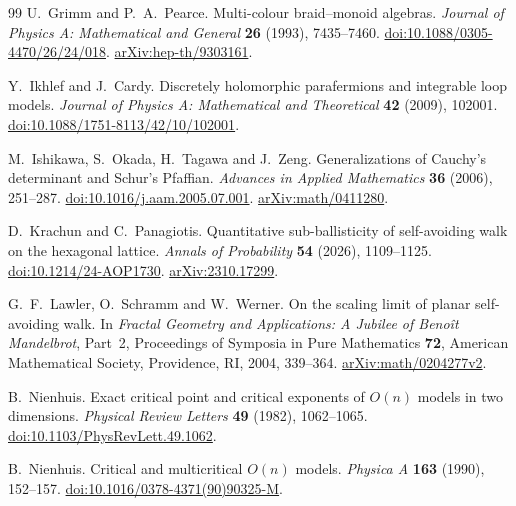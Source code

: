 \begin{thebibliography}{99}
U.~Grimm and P.~A.~Pearce.
Multi-colour braid--monoid algebras.
\emph{Journal of Physics A: Mathematical and General} \textbf{26} (1993), 7435--7460.
\href{https://doi.org/10.1088/0305-4470/26/24/018}{doi:10.1088/0305-4470/26/24/018}.
\href{https://arxiv.org/abs/hep-th/9303161}{arXiv:hep-th/9303161}.

Y.~Ikhlef and J.~Cardy.
Discretely holomorphic parafermions and integrable loop models.
\emph{Journal of Physics A: Mathematical and Theoretical} \textbf{42} (2009), 102001.
\href{https://doi.org/10.1088/1751-8113/42/10/102001}{doi:10.1088/1751-8113/42/10/102001}.

M.~Ishikawa, S.~Okada, H.~Tagawa and J.~Zeng.
Generalizations of Cauchy's determinant and Schur's Pfaffian.
\emph{Advances in Applied Mathematics} \textbf{36} (2006), 251--287.
\href{https://doi.org/10.1016/j.aam.2005.07.001}{doi:10.1016/j.aam.2005.07.001}.
\href{https://arxiv.org/abs/math/0411280}{arXiv:math/0411280}.

D.~Krachun and C.~Panagiotis.
Quantitative sub-ballisticity of self-avoiding walk on the hexagonal lattice.
\emph{Annals of Probability} \textbf{54} (2026), 1109--1125.
\href{https://doi.org/10.1214/24-AOP1730}{doi:10.1214/24-AOP1730}.
\href{https://arxiv.org/abs/2310.17299}{arXiv:2310.17299}.

G.~F.~Lawler, O.~Schramm and W.~Werner.
On the scaling limit of planar self-avoiding walk.
In \emph{Fractal Geometry and Applications: A Jubilee of Beno\^it Mandelbrot},
Part~2, Proceedings of Symposia in Pure Mathematics \textbf{72},
American Mathematical Society, Providence, RI, 2004, 339--364.
\href{https://arxiv.org/abs/math/0204277v2}{arXiv:math/0204277v2}.

B.~Nienhuis.
Exact critical point and critical exponents of $O(n)$ models in two dimensions.
\emph{Physical Review Letters} \textbf{49} (1982), 1062--1065.
\href{https://doi.org/10.1103/PhysRevLett.49.1062}{doi:10.1103/PhysRevLett.49.1062}.

B.~Nienhuis.
Critical and multicritical $O(n)$ models.
\emph{Physica A} \textbf{163} (1990), 152--157.
\href{https://doi.org/10.1016/0378-4371(90)90325-M}{doi:10.1016/0378-4371(90)90325-M}.
\end{thebibliography}
